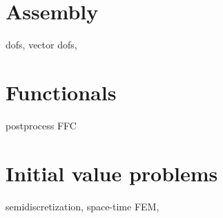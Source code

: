 \section{Assembly}

dofs, vector dofs, 

\section{Functionals}

postprocess FFC 


\section{Initial value problems}

semidiscretization, space-time FEM, 



\dolfin{}

